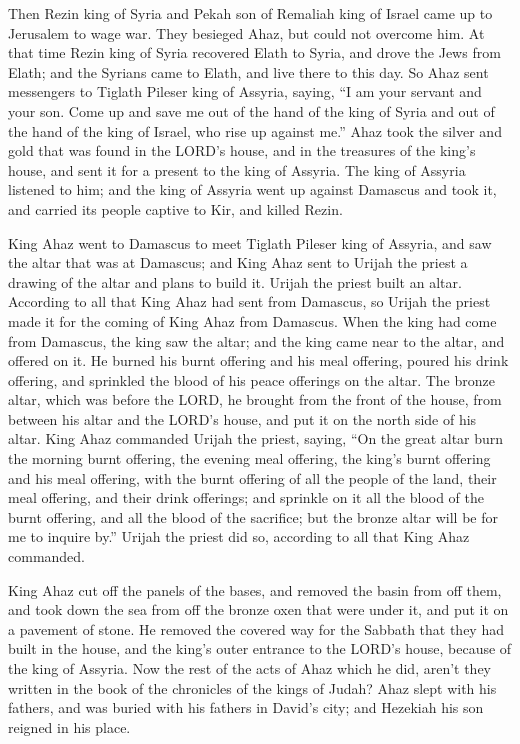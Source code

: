 \myverse{}Then Rezin king of Syria and Pekah son of Remaliah king of Israel
came up to Jerusalem to wage war. They besieged Ahaz, but could not overcome him.
\myverse{}At that time Rezin king of Syria recovered Elath to Syria, and drove the Jews
from Elath; and the Syrians came to Elath, and live there to this day.
\myverse{}So Ahaz sent messengers to Tiglath Pileser king of Assyria, saying, “I am your
servant and your son. Come up and save me out of the hand of the king of Syria and out of the hand of
the king of Israel, who rise up against me.”
\myverse{}Ahaz took the silver and gold that was found in the LORD’s house, and in the
treasures of the king’s house, and sent it for a present to the king of Assyria.
\myverse{}The king of Assyria listened to him; and the king of Assyria went up against
Damascus and took it, and carried its people captive to Kir, and killed Rezin.

\myverse{}King Ahaz went to Damascus to meet Tiglath Pileser king of Assyria,
and saw the altar that was at Damascus; and King Ahaz sent to Urijah the priest a drawing of the altar
and plans to build it.
\myverse{}Urijah the priest built an altar. According to all that King Ahaz had sent
from Damascus, so Urijah the priest made it for the coming of King Ahaz from Damascus.
\myverse{}When the king had come from Damascus, the king saw the altar; and the king
came near to the altar, and offered on it.
\myverse{}He burned his burnt offering and his meal offering, poured his drink offering,
and sprinkled the blood of his peace offerings on the altar.
\myverse{}The bronze altar, which was before the LORD, he brought from the front of
the house, from between his altar and the LORD’s house, and put it on the north side of his altar.
\myverse{}King Ahaz commanded Urijah the priest, saying, “On the great altar burn the
morning burnt offering, the evening meal offering, the king’s burnt offering and his meal offering, with
the burnt offering of all the people of the land, their meal offering, and their drink offerings; and
sprinkle on it all the blood of the burnt offering, and all the blood of the sacrifice; but the bronze
altar will be for me to inquire by.”
\myverse{}Urijah the priest did so, according to all that King Ahaz commanded.

\myverse{}King Ahaz cut off the panels of the bases, and removed the basin
from off them, and took down the sea from off the bronze oxen that were under it, and put it on a pavement
of stone.
\myverse{}He removed the covered way for the Sabbath that they had built in the house,
and the king’s outer entrance to the LORD’s house, because of the king of Assyria.
\myverse{}Now the rest of the acts of Ahaz which he did, aren’t they written in the
book of the chronicles of the kings of Judah?
\myverse{}Ahaz slept with his fathers, and was buried with his fathers in David’s city;
and Hezekiah his son reigned in his place.


